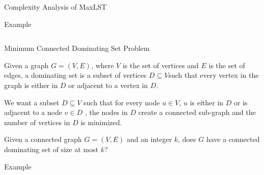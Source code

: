 \documentclass[xcolor=svgnames]{beamer}
\begin{document}
\begin{section}{Complexity Analysis of MaxLST}
\begin{frame}{Example}
\begin{columns}
\begin{column}{0.45\textwidth}
\begin{tikzpicture}
                \end{tikzpicture}
                \end{column}
            
                \begin{column}{0.45\textwidth}
                \centering
            \end{column}
        \end{columns}
        \vspace{15pt}
    \end{frame}
    
    \begin{frame}{Minimum Connected Dominating Set Problem}
        \begin{description}[<+->]
            \item[Dominating Set:]Given a graph $G=(V,E)$, where $V$ is the set of vertices and $E$ is the set of edges, a dominating set is a subset of vertices $D \subseteq V $such that every vertex in the graph is either in $D$ or adjacent to a vertex in $D$. 
            \item[Objective:] We want a subset $D \subseteq V$ such that for every node $u \in V$, $u$ is either in $D$ or is adjacent to a node $v \in D$ , the nodes in $D$ create a connected sub-graph and the number of vertices in $D$ is minimized. 
            \item[Question:]Given a connected graph $G = (V, E)$ and an integer $k$, does $G$ have a connected dominating set of size at most $k$?  
        \end{description}
    \end{frame}
    \begin{frame}{Example}


\end{frame}
\end{section}
\end{document}
